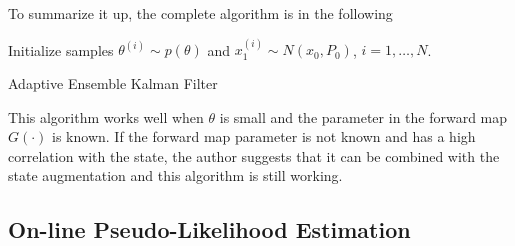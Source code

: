 To summarize it up, the complete algorithm is in the following 
\begin{algorithm}[h]
\SetAlgoLined 
Initialize samples $\theta^{(i)}\sim p(\theta)$ and $x_1^{(i)}\sim N(x_0,P_0)$, $i=1,\ldots,N$. \\
\caption{Adaptive Ensemble Kalman Filter}\label{algorithmEnKF}
\end{algorithm}

This algorithm works well when $\theta$ is small and the parameter in the forward map $G(\cdot)$ is known. If the forward map parameter is not known and has a high correlation with the state, the author suggests that it can be combined with the state augmentation \citep{anderson2001ensemble} and this algorithm is still working. 



\subsection{On-line Pseudo-Likelihood Estimation}

